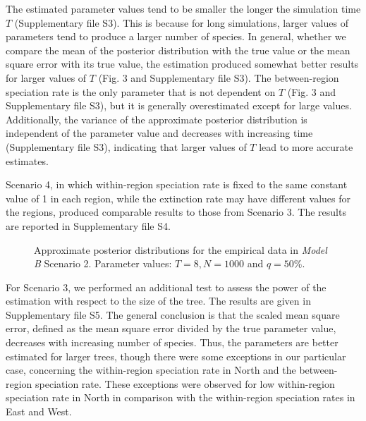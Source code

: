 The estimated parameter values tend to be smaller the longer the simulation time $T$ (Supplementary file S3). 
This is because for long simulations, larger values of parameters tend to produce a larger number of species. 
In general, whether we compare the mean of the posterior distribution with the true value or the mean square error with its true value, the estimation produced somewhat better results for larger values of $T$ (Fig. 3 and Supplementary file S3). 
The between-region speciation rate is the only parameter that is not dependent on $T$ (Fig. 3 and Supplementary file S3), but it is generally overestimated except for large values.  Additionally, the variance of the approximate posterior distribution is independent of the parameter value and decreases with increasing time (Supplementary file S3), indicating that larger values of $T$ lead to more accurate estimates. 

Scenario 4, in which within-region speciation rate is fixed to the same constant value of 1 in each region, while the extinction rate may have different values for the regions, produced comparable results to those from Scenario 3. 
The results are reported in Supplementary file S4.
%
\begin{figure*}[t]
\begin{center}
\caption{Approximate posterior distributions for the empirical data in \textit{Model B} Scenario 2. 
	Parameter values: $T = 8, N = 1000$ and $q = 50\%$.}
\label{fig:4}
\vspace{-0.2in}
\end{center}
\end{figure*}

For Scenario 3, we performed an additional test to assess the power of the estimation with respect to the size of the tree. 
The results are given in Supplementary file S5. 
The general conclusion is that the scaled mean square error, defined as the mean square error divided by the true parameter value, decreases with increasing number of species. 
Thus, the parameters are better estimated for larger trees, though there were some exceptions in our particular case, concerning the within-region speciation rate in North and the between-region speciation rate. 
These exceptions were observed for low within-region speciation rate in North in comparison with the within-region speciation rates in East and West. 

